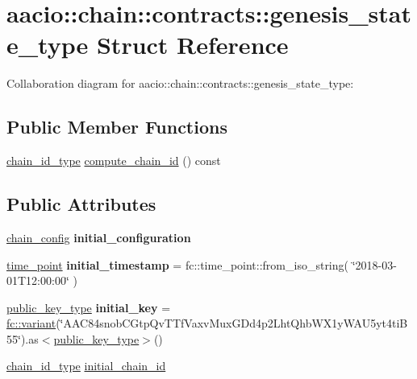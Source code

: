 \hypertarget{structaacio_1_1chain_1_1contracts_1_1genesis__state__type}{}\section{aacio\+:\+:chain\+:\+:contracts\+:\+:genesis\+\_\+state\+\_\+type Struct Reference}
\label{structaacio_1_1chain_1_1contracts_1_1genesis__state__type}


Collaboration diagram for aacio\+:\+:chain\+:\+:contracts\+:\+:genesis\+\_\+state\+\_\+type\+:
\subsection*{Public Member Functions}
\begin{DoxyCompactItemize}
\item 
\mbox{\hyperlink{classfc_1_1sha256}{chain\+\_\+id\+\_\+type}} \mbox{\hyperlink{structaacio_1_1chain_1_1contracts_1_1genesis__state__type_ae7e8ddab724fc930e5c1e2a07b8fdefb}{compute\+\_\+chain\+\_\+id}} () const
\end{DoxyCompactItemize}
\subsection*{Public Attributes}
\begin{DoxyCompactItemize}
\item 
\mbox{\hyperlink{structaacio_1_1chain_1_1chain__config}{chain\+\_\+config}} {\bfseries initial\+\_\+configuration}
\item 
\mbox{\label{structaacio_1_1chain_1_1contracts_1_1genesis__state__type_a4580666ced73d21f2d54116676fcc89f}} 
\mbox{\hyperlink{classfc_1_1time__point}{time\+\_\+point}} {\bfseries initial\+\_\+timestamp} = fc\+::time\+\_\+point\+::from\+\_\+iso\+\_\+string( \char`\"{}2018-\/03-\/01\+T12\+:00\+:00\char`\"{} )
\item 
\mbox{\label{structaacio_1_1chain_1_1contracts_1_1genesis__state__type_a53df57ed515239058b5f4b81d779cb0d}} 
\mbox{\hyperlink{classfc_1_1crypto_1_1public__key}{public\+\_\+key\+\_\+type}} {\bfseries initial\+\_\+key} = \mbox{\hyperlink{classfc_1_1variant}{fc\+::variant}}(\char`\"{}A\+A\+C84snob\+C\+Gtp\+Qv\+T\+Tf\+Vaxv\+Mux\+G\+Dd4p2\+Lht\+Qhb\+W\+X1y\+W\+A\+U5yt4ti\+B55\char`\"{}).as$<$\mbox{\hyperlink{classfc_1_1crypto_1_1public__key}{public\+\_\+key\+\_\+type}}$>$()
\item 
\mbox{\hyperlink{classfc_1_1sha256}{chain\+\_\+id\+\_\+type}} \mbox{\hyperlink{structaacio_1_1chain_1_1contracts_1_1genesis__state__type_acecee1a3e8f2e48495d6da416edd8788}{initial\+\_\+chain\+\_\+id}}
\end{DoxyCompactItemize}


